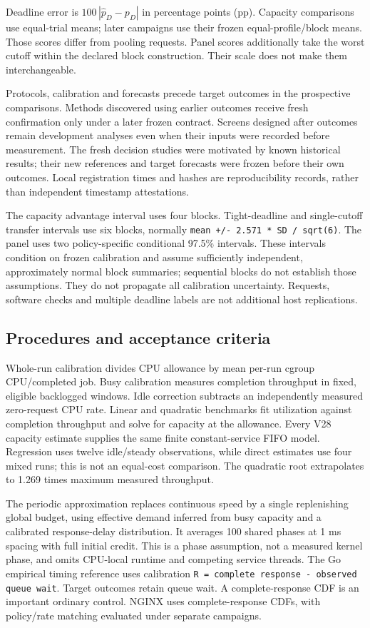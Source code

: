 \documentclass[10pt,a4paper]{article}
\begin{document}
Deadline error is \(100\,|\widehat{p}_D-p_D|\) in percentage points (pp). Capacity comparisons use equal-trial means; later campaigns use their frozen equal-profile/block means. Those scores differ from pooling requests. Panel scores additionally take the worst cutoff within the declared block construction. Their scale does not make them interchangeable.

Protocols, calibration and forecasts precede target outcomes in the prospective comparisons. Methods discovered using earlier outcomes receive fresh confirmation only under a later frozen contract. Screens designed after outcomes remain development analyses even when their inputs were recorded before measurement. The fresh decision studies were motivated by known historical results; their new references and target forecasts were frozen before their own outcomes. Local registration times and hashes are reproducibility records, rather than independent timestamp attestations.

The capacity advantage interval uses four blocks. Tight-deadline and single-cutoff transfer intervals use six blocks, normally \texttt{mean +/- 2.571 * SD / sqrt(6)}. The panel uses two policy-specific conditional 97.5\% intervals. These intervals condition on frozen calibration and assume sufficiently independent, approximately normal block summaries; sequential blocks do not establish those assumptions. They do not propagate all calibration uncertainty. Requests, software checks and multiple deadline labels are not additional host replications.

\subsection{Procedures and acceptance criteria}

Whole-run calibration divides CPU allowance by mean per-run cgroup CPU/completed job. Busy calibration measures completion throughput in fixed, eligible backlogged windows. Idle correction subtracts an independently measured zero-request CPU rate. Linear and quadratic benchmarks fit utilization against completion throughput and solve for capacity at the allowance. Every V28 capacity estimate supplies the same finite constant-service FIFO model. Regression uses twelve idle/steady observations, while direct estimates use four mixed runs; this is not an equal-cost comparison. The quadratic root extrapolates to 1.269 times maximum measured throughput.

The periodic approximation replaces continuous speed by a single replenishing global budget, using effective demand inferred from busy capacity and a calibrated response-delay distribution. It averages 100 shared phases at 1 ms spacing with full initial credit. This is a phase assumption, not a measured kernel phase, and omits CPU-local runtime and competing service threads. The Go empirical timing reference uses calibration \texttt{R = complete response - observed queue wait}. Target outcomes retain queue wait. A complete-response CDF is an important ordinary control. NGINX uses complete-response CDFs, with policy/rate matching evaluated under separate campaigns.
\end{document}
